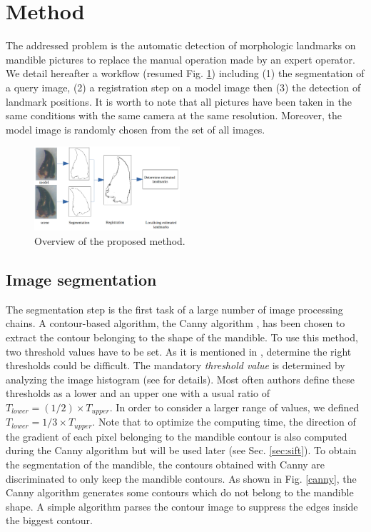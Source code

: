 \documentclass[twoside,twocolumn,10pt]{article}
\begin{document}
\section{Method}
\label{sec:method}

The addressed problem is the automatic detection of morphologic landmarks on mandible pictures to replace the manual operation made by an expert operator.
We detail hereafter a workflow (resumed Fig. \ref{fig:method}) including (1) the segmentation of a query image, (2) a registration step on a model image then (3) the detection of landmark positions.
It is worth to note that all pictures have been taken in the same conditions with the same camera at the same resolution.
Moreover, the model image is randomly chosen from the set of all images.

\begin{figure}[htbp]
    \centering
    \includegraphics[width=0.48\textwidth]{./images/method}
    \caption{Overview of the proposed method.}
    \label{fig:method}
\end{figure}

\subsection{Image segmentation}
\label{sec:segmentation}

The segmentation step is the first task of a large number of image processing chains.
A contour-based algorithm, the Canny algorithm \cite{canny1986computational}, has been chosen to extract the contour belonging to the shape of the mandible.
To use this method, two threshold values have to be set.
As it is mentioned in \cite{adaptiveCanny}, determine the right thresholds could be difficult.
The mandatory \textit{threshold value} is determined by analyzing the image histogram (see \cite{leestimating} for details).
Most often authors define these thresholds as a lower and an upper one with a usual ratio of $T_{lower} = (1/2) \times T_{upper}$.
In order to consider a larger range of values, we defined $T_{lower} = 1/3 \times T_{upper}$.
Note that to optimize the computing time, the direction of the gradient of each pixel belonging to the mandible contour is also computed during the Canny algorithm but will be used later (see Sec. \ref{sec:sift}).
To obtain the segmentation of the mandible, the contours obtained with Canny are discriminated to only keep the mandible contours.
As shown in Fig. \ref{canny}, the Canny algorithm generates some contours which do not belong to the mandible shape.
A simple algorithm parses the contour image to suppress the edges inside the biggest contour.
\end{document}
